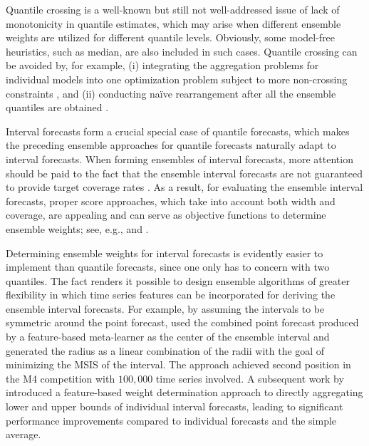 \documentclass[11pt]{article}
\begin{document}
Quantile crossing is a well-known but still not well-addressed issue of lack of monotonicity in quantile estimates, which may arise when different ensemble weights are utilized for different quantile levels. Obviously, some model-free heuristics, such as median, are also included in such cases. Quantile crossing can be avoided by, for example, (i) integrating the aggregation problems for individual models into one optimization problem subject to more non-crossing constraints \citep[e.g.,][]{Kim2021-wa}, and (ii) conducting na\"{i}ve rearrangement after all the ensemble quantiles are obtained \citep[e.g.,][]{Chernozhukov2010-zz}.

Interval forecasts form a crucial special case of quantile forecasts, which makes the preceding ensemble approaches for quantile forecasts naturally adapt to interval forecasts. When forming ensembles of interval forecasts, more attention should be paid to the fact that the ensemble interval forecasts are not guaranteed to provide target coverage rates \citep{Wallis2005-yf,Timmermann2006-en,Grushka-Cockayne2020-qv}. As a result, for evaluating the ensemble interval forecasts, proper score approaches, which take into account both width and coverage, are appealing and can serve as objective functions to determine ensemble weights; see, e.g., \cite{Gneiting2007-ij} and \cite{Jose2009-lh}.

Determining ensemble weights for interval forecasts is evidently easier to implement than quantile forecasts, since one only has to concern with two quantiles. The fact renders it possible to design ensemble algorithms of greater flexibility in which time series features can be incorporated for deriving the ensemble interval forecasts. For example, by assuming the intervals to be symmetric around the point forecast, \cite{Montero-Manso2020-tq} used the combined point forecast produced by a feature-based meta-learner as the center of the ensemble interval and generated the radius as a linear combination of the radii with the goal of minimizing the MSIS \citep[mean scaled interval score,][]{Gneiting2007-ij} of the interval. The approach achieved second position in the M4 competition with $100,000$ time series involved. A subsequent work by \cite{Wang2021-un} introduced a feature-based weight determination approach to directly aggregating lower and upper bounds of individual interval forecasts, leading to significant performance improvements compared to individual forecasts and the simple average.
\end{document}
